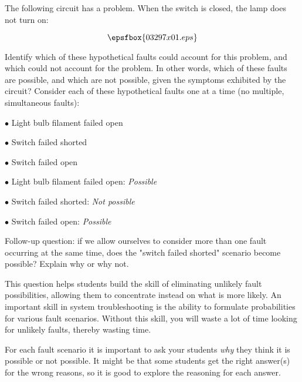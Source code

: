 

The following circuit has a problem.  When the switch is closed, the lamp does not turn on:

$$\epsfbox{03297x01.eps}$$

\goodbreak
Identify which of these hypothetical faults could account for this problem, and which could not account for the problem.  In other words, which of these faults are possible, and which are not possible, given the symptoms exhibited by the circuit?  Consider each of these hypothetical faults one at a time (no multiple, simultaneous faults):

\medskip
\item{$\bullet$} Light bulb filament failed open
\item{$\bullet$} Switch failed shorted
\item{$\bullet$} Switch failed open
\medskip







\medskip
\item{$\bullet$} Light bulb filament failed open: {\it Possible}
\item{$\bullet$} Switch failed shorted: {\it Not possible}
\item{$\bullet$} Switch failed open: {\it Possible}
\medskip

\vskip 10pt

Follow-up question: if we allow ourselves to consider more than one fault occurring at the same time, does the "switch failed shorted" scenario become possible?  Explain why or why not.







This question helps students build the skill of eliminating unlikely fault possibilities, allowing them to concentrate instead on what is more likely.  An important skill in system troubleshooting is the ability to formulate probabilities for various fault scenarios.  Without this skill, you will waste a lot of time looking for unlikely faults, thereby wasting time.

For each fault scenario it is important to ask your students {\it why} they think it is possible or not possible.  It might be that some students get the right answer(s) for the wrong reasons, so it is good to explore the reasoning for each answer.




